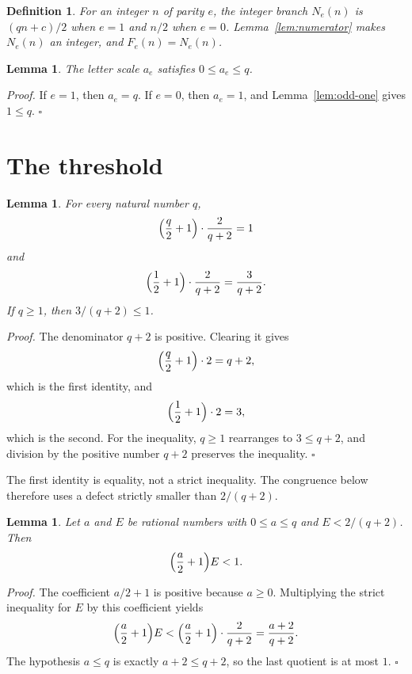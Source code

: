 \documentclass[11pt,letterpaper]{article}
\newtheorem{lemma}[theorem]{Lemma}
\newtheorem{definition}[theorem]{Definition}
\newenvironment{proof}{\noindent\textit{Proof.}}{\hfill\(\square\)}
\begin{document}
\begin{definition}
\label{def:int-branch}
For an integer \(n\) of parity \(e\), the integer branch \(N_e(n)\) is \((qn+c)/2\) when \(e=1\) and \(n/2\) when \(e=0\). Lemma~\ref{lem:numerator} makes \(N_e(n)\) an integer, and \(F_e(n)=N_e(n)\).
\end{definition}

\begin{lemma}
\label{lem:letter-bounds}
The letter scale \(a_e\) satisfies \(0\leq a_e\leq q\).
\end{lemma}

\begin{proof}
If \(e=1\), then \(a_e=q\). If \(e=0\), then \(a_e=1\), and Lemma~\ref{lem:odd-one} gives \(1\leq q\).
\end{proof}

\section{The threshold}

\begin{lemma}
\label{lem:saturate}
For every natural number \(q\),
\[
\Bigl(\frac{q}{2}+1\Bigr)\cdot\frac{2}{q+2}=1
\]
and
\[
\Bigl(\frac{1}{2}+1\Bigr)\cdot\frac{2}{q+2}=\frac{3}{q+2}.
\]
If \(q\geq 1\), then \(3/(q+2)\leq 1\).
\end{lemma}

\begin{proof}
The denominator \(q+2\) is positive. Clearing it gives
\[
\Bigl(\frac{q}{2}+1\Bigr)\cdot 2=q+2,
\]
which is the first identity, and
\[
\Bigl(\frac{1}{2}+1\Bigr)\cdot 2=3,
\]
which is the second. For the inequality, \(q\geq 1\) rearranges to \(3\leq q+2\), and division by the positive number \(q+2\) preserves the inequality.
\end{proof}

The first identity is equality, not a strict inequality. The congruence below therefore uses a defect strictly smaller than \(2/(q+2)\).

\begin{lemma}
\label{lem:scale}
Let \(a\) and \(E\) be rational numbers with \(0\leq a\leq q\) and \(E<2/(q+2)\). Then
\[
\Bigl(\frac{a}{2}+1\Bigr)E<1.
\]
\end{lemma}

\begin{proof}
The coefficient \(a/2+1\) is positive because \(a\geq 0\). Multiplying the strict inequality for \(E\) by this coefficient yields
\[
\Bigl(\frac{a}{2}+1\Bigr)E
<\Bigl(\frac{a}{2}+1\Bigr)\cdot\frac{2}{q+2}
=\frac{a+2}{q+2}.
\]
The hypothesis \(a\leq q\) is exactly \(a+2\leq q+2\), so the last quotient is at most \(1\).
\end{proof}
\end{document}
